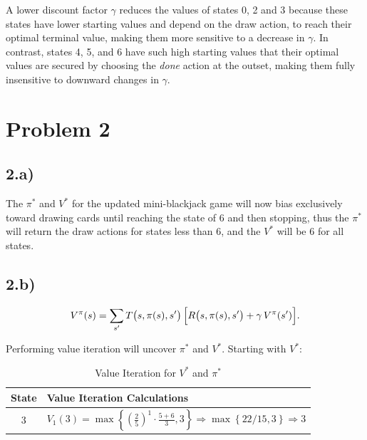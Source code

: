 \documentclass[11pt]{article}
\begin{document}
A lower discount factor \(\gamma\) reduces the values of states 0, 2 and 3 because these states have lower starting values and depend on the draw action,
to reach their optimal terminal value, making them more sensitive to a decrease in $\gamma$.
In contrast, states 4, 5, and 6 have such high starting values that their optimal values are secured by choosing the \textit{done} action at the outset,
making them fully insensitive to downward changes in $\gamma$.

\newpage
\section*{Problem 2}
\subsection*{2.a)}
The $\pi^*$ and $V^*$ for the updated mini-blackjack game will now bias exclusively toward drawing cards until reaching the state of 6 and
then stopping, thus the $\pi^*$ will return the draw actions for states less than 6, and the $V^*$ will be 6 for all states.

\subsection*{2.b)}

\[
V^\pi(s) = \sum_{s'} T\bigl(s, \pi(s), s'\bigr)\,\Bigl[R\bigl(s, \pi(s), s'\bigr) + \gamma\,V^\pi(s')\Bigr].
\]

\begin{flushleft}
Performing value iteration will uncover $\pi^*$ and $V^*$.
Starting with $V^*$:
\end{flushleft}
\begin{table}[h]
\centering
\renewcommand{\arraystretch}{1.5} %
\caption{Value Iteration for $V^*$ and $\pi^*$}
\label{tab:val_iteration}
\vspace{1em}

\begin{tabular}{c|l}
\hline
\textbf{State} & \textbf{Value Iteration Calculations} \\
\hline

3 &
$V_1(3) = \max \left\{ (\frac{2}{5})^1 \cdot \frac{5+6}{3}, 3 \right\}
\Rightarrow \max \left\{ 22/15 , 3  \right\}
\Rightarrow 3$ \\
\hline
\end{tabular}
\end{table}
\end{document}
